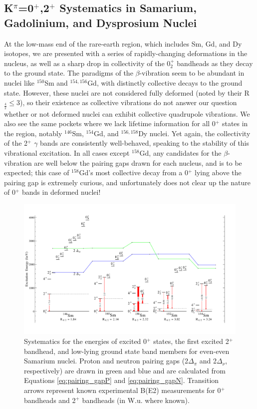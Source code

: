 \subsection{K$^\pi$=0$^+$,2$^+$ Systematics in Samarium, Gadolinium, and Dysprosium Nuclei}
At the low-mass end of the rare-earth region, which includes Sm, Gd, and Dy isotopes, we are presented with a series of rapidly-changing deformations in the nucleus, as well as a sharp drop in collectivity of the 0$^+_2$ bandheads as they decay to the ground state. The paradigms of the $\beta$-vibration seem to be abundant in nuclei like $^{150}$Sm and $^{154,156}$Gd, with distinctly collective decays to the ground state. However, these nuclei are not considered fully deformed (noted by their R$_\frac{4}{2}\leq$3), so their existence as collective vibrations do not answer our question whether or not deformed nuclei can exhibit collective quadrupole vibrations. We also see the same pockets where we lack lifetime information for all 0$^+$ states in the region, notably $^{146}$Sm, $^{154}$Gd, and $^{156,158}$Dy nuclei. Yet again, the collectivity of the 2$^+$ $\gamma$ bands are consistently well-behaved, speaking to the stability of this vibrational excitation. In all cases except $^{158}$Gd, any candidates for the $\beta$-vibration are well below the pairing gaps drawn for each nucleus, and is to be expected; this case of $^{158}$Gd's most collective decay from a 0$^+$ lying above the pairing gap is extremely curious, and unfortunately does not clear up the nature of 0$^+$ bands in deformed nuclei!

\begin{landscape}
\begin{figure}[ht] 
\begin{center}
\includegraphics[height=0.8\textheight]{SciDraw_SmSystematics.pdf}
\caption{Systematics for the energies of excited 0$^+$ states, the first excited 2$^+$ bandhead, and low-lying ground state band members for even-even Samarium nuclei. Proton and neutron pairing gaps (2$\Delta_\pi$ and 2$\Delta_\nu$, respectively) are drawn in green and blue and are calculated from Equations \ref{eq:pairing_gapP} and \ref{eq:pairing_gapN}. Transition arrows represent known experimental B(E2) measurements for 0$^+$ bandheads and 2$^+$ bandheads (in W.u. where known).
\label{fig:SmSystematics}}
\end{center}
\end{figure}
\end{landscape}

